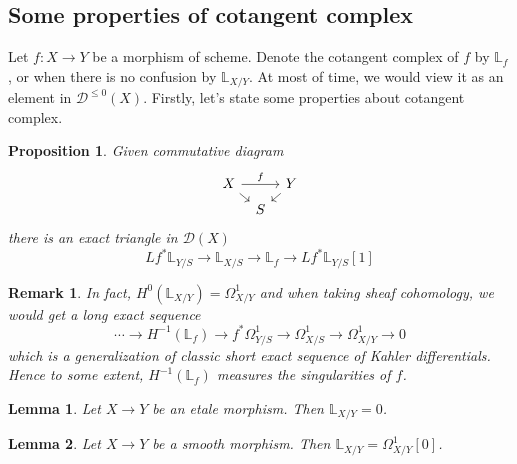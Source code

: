 \documentclass{ctexart}
\newtheorem{remark}{Remark}[section]
\newtheorem{proposition}{Proposition}[section]
\newtheorem{lemma}{Lemma}[section]
\begin{document}
\subsection{Some properties of cotangent complex}
\label{subsection:Cotangent_Complex_Some_properties_of_cotangent_complex}

Let $f: X \rightarrow Y$ be a morphism of scheme.
Denote the cotangent complex of $f$ by $\mathbb{L}_{f}$, or when there is no confusion by $\mathbb{L}_{X/Y}$.
At most of time, we would view it as an element in $\mathcal{D}^{\le 0}(X)$.
Firstly, let's state some properties about cotangent complex.
\begin{proposition}
    Given commutative diagram
    \begin{equation}
        \begin{tikzcd}[sep = tiny]
            X \arrow[rr, "f"] \arrow[dr] &&
            Y \arrow[dl] \\
            & S &
        \end{tikzcd}
    \end{equation}
    there is an exact triangle in $\mathcal{D}(X)$
    \begin{equation}
        Lf^{\ast}\mathbb{L}_{Y/S} \longrightarrow \mathbb{L}_{X/S} \longrightarrow \mathbb{L}_{f} \longrightarrow Lf^{\ast}\mathbb{L}_{Y/S}[1]
    \end{equation}
    \vspace{-1.5\baselineskip} %
    \label{Proposition 7.1}
\end{proposition}
\begin{remark}
    In fact, $H^{0}(\mathbb{L}_{X/Y}) = \Omega_{X/Y}^{1}$ and when taking sheaf cohomology, we would get a long exact sequence
    \begin{equation}
        \cdots \longrightarrow H^{-1}(\mathbb{L}_{f}) \longrightarrow f^{\ast}\Omega_{Y/S}^{1} \longrightarrow \Omega_{X/S}^{1} \longrightarrow \Omega_{X/Y}^{1} \longrightarrow 0
    \end{equation}
    which is a generalization of classic short exact sequence of Kahler differentials.
    Hence to some extent, $H^{-1}(\mathbb{L}_{f})$ measures the singularities of $f$.
\end{remark}
\begin{lemma}
    Let $X \rightarrow Y$ be an etale morphism.
    Then $\mathbb{L}_{X/Y} = 0$.
    \label{Lemma 7.1}
\end{lemma}
\begin{lemma}
    Let $X \rightarrow Y$ be a smooth morphism.
    Then $\mathbb{L}_{X/Y} = \Omega_{X/Y}^{1}[0]$.
    \label{Lemma 7.2}
\end{lemma}
\end{document}
